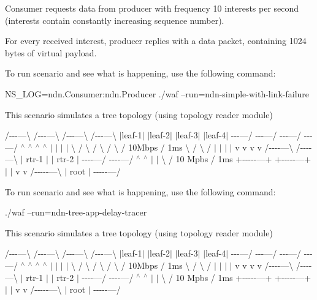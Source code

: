 Consumer requests data from producer with frequency 10 interests per second (interests contain constantly increasing sequence number).

For every received interest, producer replies with a data packet, containing 1024 bytes of virtual payload.

To run scenario and see what is happening, use the following command\+: \begin{DoxyVerb}NS_LOG=ndn.Consumer:ndn.Producer ./waf --run=ndn-simple-with-link-failure\end{DoxyVerb}


This scenario simulates a tree topology (using topology reader module)

/-\/-\/-\/---\textbackslash{} /-\/-\/-\/---\textbackslash{} /-\/-\/-\/---\textbackslash{} /-\/-\/-\/---\textbackslash{} $\vert$leaf-\/1$\vert$ $\vert$leaf-\/2$\vert$ $\vert$leaf-\/3$\vert$ $\vert$leaf-\/4$\vert$ -\/-\/-\/---/ -\/-\/-\/---/ -\/-\/-\/---/ -\/-\/-\/---/ $^\wedge$ $^\wedge$ $^\wedge$ $^\wedge$ $\vert$ $\vert$ $\vert$ $\vert$ \textbackslash{} / \textbackslash{} / \textbackslash{} / \textbackslash{} / 10\+Mbps / 1ms \textbackslash{} / \textbackslash{} / $\vert$ $\vert$ $\vert$ $\vert$ v v v v /-\/-\/-\/-\/---\textbackslash{} /-\/-\/-\/-\/---\textbackslash{} $\vert$ rtr-\/1 $\vert$ $\vert$ rtr-\/2 $\vert$ -\/-\/-\/-\/---/ -\/-\/-\/-\/---/ $^\wedge$ $^\wedge$ $\vert$ $\vert$ \textbackslash{} / 10 Mpbs / 1ms +-\/-\/-\/-\/-\/---+ +-\/-\/-\/-\/-\/---+ $\vert$ $\vert$ v v /-\/-\/-\/-\/-\/---\textbackslash{} $\vert$ root $\vert$ -\/-\/-\/-\/-\/---/

To run scenario and see what is happening, use the following command\+: \begin{DoxyVerb}./waf --run=ndn-tree-app-delay-tracer\end{DoxyVerb}


This scenario simulates a tree topology (using topology reader module)

/-\/-\/-\/---\textbackslash{} /-\/-\/-\/---\textbackslash{} /-\/-\/-\/---\textbackslash{} /-\/-\/-\/---\textbackslash{} $\vert$leaf-\/1$\vert$ $\vert$leaf-\/2$\vert$ $\vert$leaf-\/3$\vert$ $\vert$leaf-\/4$\vert$ -\/-\/-\/---/ -\/-\/-\/---/ -\/-\/-\/---/ -\/-\/-\/---/ $^\wedge$ $^\wedge$ $^\wedge$ $^\wedge$ $\vert$ $\vert$ $\vert$ $\vert$ \textbackslash{} / \textbackslash{} / \textbackslash{} / \textbackslash{} / 10\+Mbps / 1ms \textbackslash{} / \textbackslash{} / $\vert$ $\vert$ $\vert$ $\vert$ v v v v /-\/-\/-\/-\/---\textbackslash{} /-\/-\/-\/-\/---\textbackslash{} $\vert$ rtr-\/1 $\vert$ $\vert$ rtr-\/2 $\vert$ -\/-\/-\/-\/---/ -\/-\/-\/-\/---/ $^\wedge$ $^\wedge$ $\vert$ $\vert$ \textbackslash{} / 10 Mpbs / 1ms +-\/-\/-\/-\/-\/---+ +-\/-\/-\/-\/-\/---+ $\vert$ $\vert$ v v /-\/-\/-\/-\/-\/---\textbackslash{} $\vert$ root $\vert$ -\/-\/-\/-\/-\/---/

